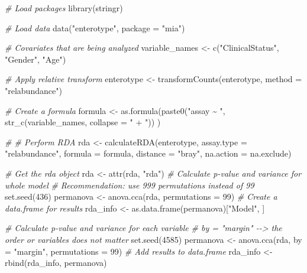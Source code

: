 \documentclass[
]{book}
\newenvironment{Shaded}{\begin{snugshade}}{\end{snugshade}}
\newcommand{\AttributeTok}[1]{\textcolor[rgb]{0.77,0.63,0.00}{#1}}
\newcommand{\CommentTok}[1]{\textcolor[rgb]{0.56,0.35,0.01}{\textit{#1}}}
\newcommand{\DecValTok}[1]{\textcolor[rgb]{0.00,0.00,0.81}{#1}}
\newcommand{\FunctionTok}[1]{\textcolor[rgb]{0.00,0.00,0.00}{#1}}
\newcommand{\NormalTok}[1]{#1}
\newcommand{\OtherTok}[1]{\textcolor[rgb]{0.56,0.35,0.01}{#1}}
\newcommand{\StringTok}[1]{\textcolor[rgb]{0.31,0.60,0.02}{#1}}
\begin{document}
\begin{Shaded}
\begin{Highlighting}[]
\CommentTok{\# Load packages}
\FunctionTok{library}\NormalTok{(stringr)}

\CommentTok{\# Load data}
\FunctionTok{data}\NormalTok{(}\StringTok{"enterotype"}\NormalTok{, }\AttributeTok{package =} \StringTok{"mia"}\NormalTok{)}

\CommentTok{\# Covariates that are being analyzed}
\NormalTok{variable\_names }\OtherTok{\textless{}{-}} \FunctionTok{c}\NormalTok{(}\StringTok{"ClinicalStatus"}\NormalTok{, }\StringTok{"Gender"}\NormalTok{, }\StringTok{"Age"}\NormalTok{)}

\CommentTok{\# Apply relative transform}
\NormalTok{enterotype }\OtherTok{\textless{}{-}} \FunctionTok{transformCounts}\NormalTok{(enterotype, }\AttributeTok{method =} \StringTok{"relabundance"}\NormalTok{)}

\CommentTok{\# Create a formula}
\NormalTok{formula }\OtherTok{\textless{}{-}} \FunctionTok{as.formula}\NormalTok{(}\FunctionTok{paste0}\NormalTok{(}\StringTok{"assay \textasciitilde{} "}\NormalTok{, }\FunctionTok{str\_c}\NormalTok{(variable\_names, }\AttributeTok{collapse =} \StringTok{" + "}\NormalTok{)) )}

\CommentTok{\# \# Perform RDA}
\NormalTok{rda }\OtherTok{\textless{}{-}} \FunctionTok{calculateRDA}\NormalTok{(enterotype,}
                    \AttributeTok{assay.type =} \StringTok{"relabundance"}\NormalTok{,}
                    \AttributeTok{formula =}\NormalTok{ formula,}
                    \AttributeTok{distance =} \StringTok{"bray"}\NormalTok{,}
                    \AttributeTok{na.action =}\NormalTok{ na.exclude)}

\CommentTok{\# Get the rda object}
\NormalTok{rda }\OtherTok{\textless{}{-}} \FunctionTok{attr}\NormalTok{(rda, }\StringTok{"rda"}\NormalTok{)}
\CommentTok{\# Calculate p{-}value and variance for whole model}
\CommentTok{\# Recommendation: use 999 permutations instead of 99}
\FunctionTok{set.seed}\NormalTok{(}\DecValTok{436}\NormalTok{)}
\NormalTok{permanova }\OtherTok{\textless{}{-}} \FunctionTok{anova.cca}\NormalTok{(rda, }\AttributeTok{permutations =} \DecValTok{99}\NormalTok{)}
\CommentTok{\# Create a data.frame for results}
\NormalTok{rda\_info }\OtherTok{\textless{}{-}} \FunctionTok{as.data.frame}\NormalTok{(permanova)[}\StringTok{"Model"}\NormalTok{, ]}

\CommentTok{\# Calculate p{-}value and variance for each variable}
\CommentTok{\# by = "margin" {-}{-}\textgreater{} the order or variables does not matter}
\FunctionTok{set.seed}\NormalTok{(}\DecValTok{4585}\NormalTok{)}
\NormalTok{permanova }\OtherTok{\textless{}{-}} \FunctionTok{anova.cca}\NormalTok{(rda, }\AttributeTok{by =} \StringTok{"margin"}\NormalTok{,  }\AttributeTok{permutations =} \DecValTok{99}\NormalTok{)}
\CommentTok{\# Add results to data.frame}
\NormalTok{rda\_info }\OtherTok{\textless{}{-}} \FunctionTok{rbind}\NormalTok{(rda\_info, permanova)}


\end{Highlighting}
\end{Shaded}
\end{document}
